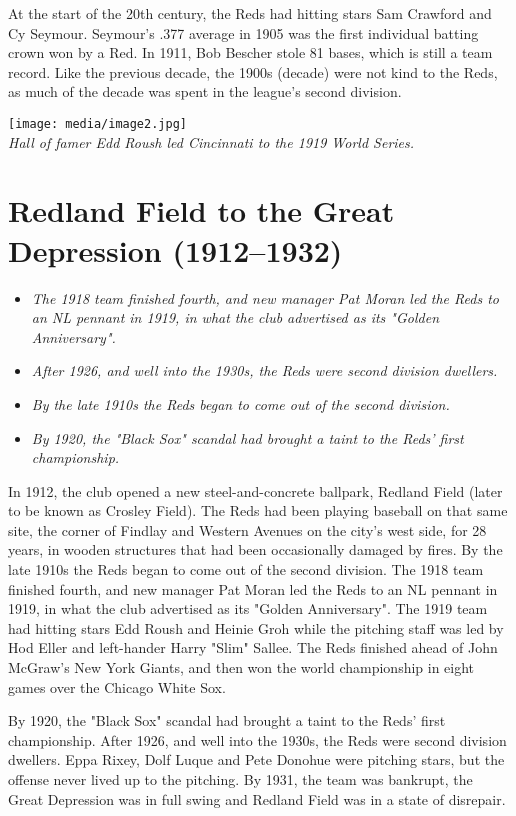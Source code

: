 At the start of the 20th century, the Reds had hitting stars Sam
Crawford and Cy Seymour. Seymour's .377 average in 1905 was the first
individual batting crown won by a Red. In 1911, Bob Bescher stole 81
bases, which is still a team record. Like the previous decade, the 1900s
(decade) were not kind to the Reds, as much of the decade was spent in
the league's second division.

\texttt{[image: media/image2.jpg]}\\
\emph{Hall of famer Edd Roush led Cincinnati to the 1919 World Series.}

\section{Redland Field to the Great Depression
(1912--1932)}\label{redland-field-to-the-great-depression-19121932}

\begin{itemize}
\item
  \emph{The 1918 team finished fourth, and new manager Pat Moran led the
  Reds to an NL pennant in 1919, in what the club advertised as its
  "Golden Anniversary".}
\item
  \emph{After 1926, and well into the 1930s, the Reds were second
  division dwellers.}
\item
  \emph{By the late 1910s the Reds began to come out of the second
  division.}
\item
  \emph{By 1920, the "Black Sox" scandal had brought a taint to the
  Reds' first championship.}
\end{itemize}

In 1912, the club opened a new steel-and-concrete ballpark, Redland
Field (later to be known as Crosley Field). The Reds had been playing
baseball on that same site, the corner of Findlay and Western Avenues on
the city's west side, for 28 years, in wooden structures that had been
occasionally damaged by fires. By the late 1910s the Reds began to come
out of the second division. The 1918 team finished fourth, and new
manager Pat Moran led the Reds to an NL pennant in 1919, in what the
club advertised as its "Golden Anniversary". The 1919 team had hitting
stars Edd Roush and Heinie Groh while the pitching staff was led by Hod
Eller and left-hander Harry "Slim" Sallee. The Reds finished ahead of
John McGraw's New York Giants, and then won the world championship in
eight games over the Chicago White Sox.

By 1920, the "Black Sox" scandal had brought a taint to the Reds' first
championship. After 1926, and well into the 1930s, the Reds were second
division dwellers. Eppa Rixey, Dolf Luque and Pete Donohue were pitching
stars, but the offense never lived up to the pitching. By 1931, the team
was bankrupt, the Great Depression was in full swing and Redland Field
was in a state of disrepair.

